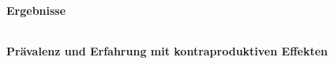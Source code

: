 \documentclass[sigconf, nonacm]{acmart}
\begin{document}
\paragraph{Ergebnisse}$~$

\textbf{Prävalenz und Erfahrung mit kontraproduktiven Effekten}
\\
\end{document}
